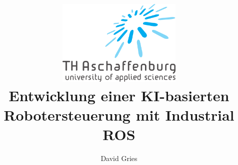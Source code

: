 











\author{David Gries}
\title{\texorpdfstring{\hspace{-0.3cm}\includegraphics[width=6cm]{Bilder/thab_logo.png}\\[3cm]}{}Entwicklung einer KI-basierten Robotersteuerung mit Industrial ROS}
\subject{Automatische Erkennung und Lokalisierung von Objekten durch ein 3D-Kamerasystem}



   \frontmatter
   
   

   \setcounter{page}{0}
   \pagestyle{plain}
   \setcounter{secnumdepth}{3}                        %
   \setcounter{tocdepth}{2}
   \maintoc                                           %


   \newpage {}
   
   
